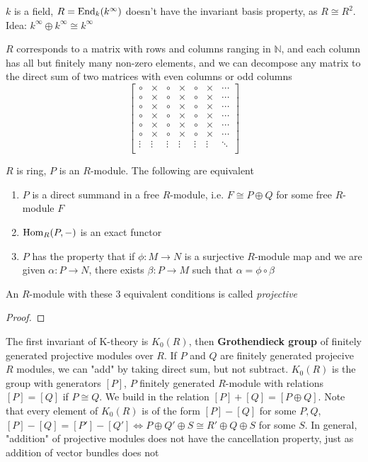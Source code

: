 \documentclass[main]{subfiles}
\begin{document}
\begin{exercise}
$k$ is a field, $R=\operatorname{End}_k(k^\infty)$ doesn't have the invariant basis property, as $R\cong R^2$. Idea: $k^\infty\oplus k^\infty\cong k^\infty$
\end{exercise}

\begin{solution}
$R$ corresponds to a matrix with rows and columns ranging in $\mathbb N$, and each column has all but finitely many non-zero elements, and we can decompose any matrix to the direct sum of two matrices with even columns or odd columns
\[
\begin{bmatrix}
\circ&\times&\circ&\times&\circ&\times&\cdots\\
\circ&\times&\circ&\times&\circ&\times&\cdots\\
\circ&\times&\circ&\times&\circ&\times&\cdots\\
\circ&\times&\circ&\times&\circ&\times&\cdots\\
\circ&\times&\circ&\times&\circ&\times&\cdots\\
\circ&\times&\circ&\times&\circ&\times&\cdots\\
\vdots&\vdots&\vdots&\vdots&\vdots&\vdots&\ddots\\
\end{bmatrix}
\]
\end{solution}

\begin{theorem}
$R$ is ring, $P$ is an $R$-module. The following are equivalent
\begin{enumerate}[leftmargin=*]
\item $P$ is a direct summand in a free $R$-module, i.e. $F\cong P\oplus Q$ for some free $R$-module $F$
\item $\operatorname{Hom}_R(P,-)$ is an exact functor
\item $P$ has the property that if $\phi:M\to N$ is a surjective $R$-module map and we are given $\alpha:P\to N$, there exists $\beta:P\to M$ such that $\alpha=\phi\circ\beta$
\end{enumerate}
An $R$-module with these 3 equivalent conditions is called \textit{projective}
\end{theorem}

\begin{proof}

\end{proof}

The first invariant of K-theory is $K_0(R)$, then \textbf{Grothendieck group} of finitely generated projective modules over $R$. If $P$ and $Q$ are finitely generated projecive $R$ modules, we can "add" by taking direct sum, but not subtract. $K_0(R)$ is the group with generators $[P]$, $P$ finitely generated $R$-module with relations $[P]=[Q]$ if $P\cong Q$. We build in the relation $[P]+[Q]=[P\oplus Q]$. Note that every element of $K_0(R)$ is of the form $[P]-[Q]$ for some $P,Q$, $[P]-[Q]=[P']-[Q']\iff P\oplus Q'\oplus S\cong R'\oplus Q\oplus S$ for some $S$. In general, "addition" of projective modules does not have the cancellation property, just as addition of vector bundles does not
\end{document}
